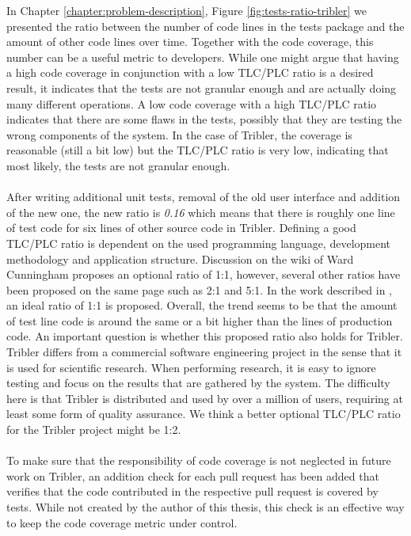 In Chapter \ref{chapter:problem-description}, Figure \ref{fig:tests-ratio-tribler} we presented the ratio between the number of code lines in the tests package and the amount of other code lines over time. Together with the code coverage, this number can be a useful metric to developers. While one might argue that having a high code coverage in conjunction with a low TLC/PLC ratio is a desired result, it indicates that the tests are not granular enough and are actually doing many different operations. A low code coverage with a high TLC/PLC ratio indicates that there are some flaws in the tests, possibly that they are testing the wrong components of the system. In the case of Tribler, the coverage is reasonable (still a bit low) but the TLC/PLC ratio is very low, indicating that most likely, the tests are not granular enough.\\\\
After writing additional unit tests, removal of the old user interface and addition of the new one, the new ratio is \emph{0.16} which means that there is roughly one line of test code for six lines of other source code in Tribler. Defining a good TLC/PLC ratio is dependent on the used programming language, development methodology and application structure. Discussion on the wiki of Ward Cunningham\cite{c2tlcratio} proposes an optional ratio of 1:1, however, several other ratios have been proposed on the same page such as 2:1 and 5:1. In the work described in \cite{van2001refactoring}, an ideal ratio of 1:1 is proposed. Overall, the trend seems to be that the amount of test line code is around the same or a bit higher than the lines of production code. An important question is whether this proposed ratio also holds for Tribler. Tribler differs from a commercial software engineering project in the sense that it is used for scientific research. When performing research, it is easy to ignore testing and focus on the results that are gathered by the system. The difficulty here is that Tribler is distributed and used by over a million of users, requiring at least some form of quality assurance. We think a better optional TLC/PLC ratio for the Tribler project might be 1:2.\\\\
To make sure that the responsibility of code coverage is not neglected in future work on Tribler, an addition check for each pull request has been added that verifies that the code contributed in the respective pull request is covered by tests. While not created by the author of this thesis, this check is an effective way to keep the code coverage metric under control.

